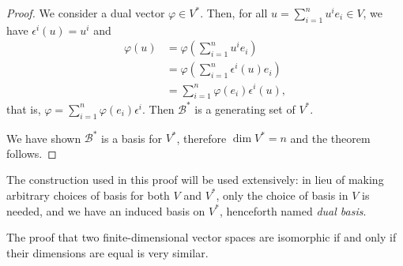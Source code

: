 \begin{proof}
    We consider a dual vector \(\varphi \in V ^{\ast}\). Then, for all \(u = \sum_{i =1}^n u^ie_i \in V\), we have \(\epsilon^i(u) = u^i\) and
    \begin{align*}
        \varphi(u) &= \varphi\left(\sum_{i=1}^n u^ie_i\right)\\
                   &= \varphi\left(\sum_{i=1}^n \epsilon^i(u) e_i\right)\\
                   &= \sum_{i=1}^n \varphi(e_i)\epsilon^i(u),
    \end{align*}
    that is, \(\varphi = \sum_{i=1}^n \varphi(e_i) \epsilon^i\). Then \(\mathcal{B}^{\ast}\) is a generating set of \(V^{\ast}\).

    We have shown \(\mathcal{B}^{\ast}\) is a basis for \(V ^{\ast}\), therefore \(\dim V ^{\ast}= n\) and the theorem follows.
\end{proof}
\begin{remark}
    The construction used in this proof will be used extensively: in lieu of making arbitrary choices of basis for both \(V\) and \(V ^{\ast}\), only the choice of basis in \(V\) is needed, and we have an induced basis on \(V ^{\ast}\), henceforth named \emph{dual basis}.
\end{remark}
\begin{remark}
    The proof that two finite-dimensional vector spaces are isomorphic if and only if their dimensions are equal is very similar.
\end{remark}

